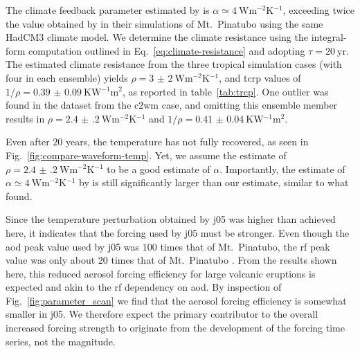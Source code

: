 \documentclass{ametsocV6.1}
\begin{document}
The climate feedback parameter estimated by \citet{jones2005} is \(\alpha \simeq
\SI{4}{\watt\metre^{-2}\kelvin^{-1}}\), exceeding twice the value obtained by
\citet{gregory2016} in their simulations of Mt.\ Pinatubo using the same HadCM3 climate
model. We determine the climate resistance using the integral-form computation outlined
in Eq.~\ref{eq:climate-resistance} and adopting \(\tau =\SI{20}{\mathrm{yr}}\). The
estimated climate resistance from the three tropical simulation cases (with four in each
ensemble) yields \(\rho =\SI{3(2)}{\watt\metre^{-2}\kelvin^{-1}}\), and \gls{tcrp}
values of \(1/\rho=\SI{0.39(9)}{\kelvin\watt^{-1}\metre^{2}}\), as reported in
table~\ref{tab:trcp}. One outlier was found in the dataset from the \gls{c2wm} case, and
omitting this ensemble member results in \(\rho
=\SI{2.4(2)}{\watt\metre^{-2}\kelvin^{-1}}\) and \(1/\rho
=\SI{0.41(4)}{\kelvin\watt^{-1}\metre^{2}}\).

Even after \(20\) years, the temperature has not fully recovered, as seen in
Fig.~\ref{fig:compare-waveform-temp}. Yet, we assume the estimate of \(\rho
=\SI{2.4(2)}{\watt\metre^{-2}\kelvin^{-1}}\) to be a good estimate of \(\alpha \).
Importantly, the estimate of \(\alpha \simeq \SI{4}{\watt\metre^{-2}\kelvin^{-1}}\) by
\citet{jones2005} is still significantly larger than our estimate, similar to what
\citet{gregory2016} found.

Since the temperature perturbation obtained by \gls{j05} was higher than achieved here,
it indicates that the forcing used by \gls{j05} must be stronger. Even though the
\gls{aod} peak value used by \gls{j05} was \(100\) times that of Mt.\ Pinatubo, the
\gls{rf} peak value was only about \(20\) times that of Mt.\ Pinatubo
\citep{gregory2016}. From the results shown here, this reduced aerosol forcing
efficiency for large volcanic eruptions is expected and akin to the \gls{rf} dependency
on \gls{aod}. By inspection of Fig.~\ref{fig:parameter_scan} we find that the
aerosol forcing efficiency is somewhat smaller in \gls{j05}. We therefore expect the
primary contributor to the overall increased forcing strength to originate from the
development of the forcing time series, not the magnitude.
\end{document}
